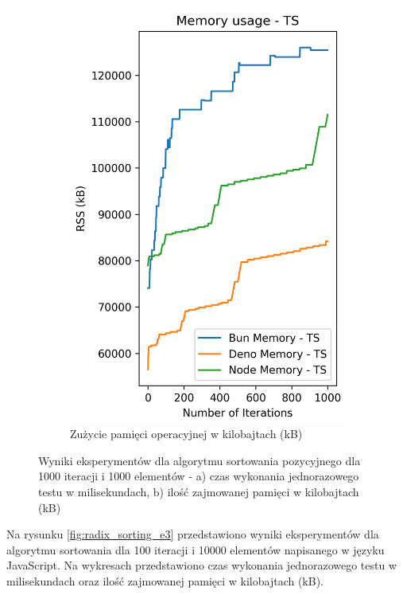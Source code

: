 \begin{figure}[H]
\begin{subfigure}[b]{0.42\textwidth}
    \includegraphics[width=\textwidth]{Figures/sorting/sorting_radix_1000_1000_ts_memory.png}
    \caption{Zużycie pamięci operacyjnej w kilobajtach (kB)}
    \label{fig:radix_sorting_e2_ts_memory}
  \end{subfigure}
  \caption{Wyniki eksperymentów dla algorytmu sortowania pozycyjnego dla 1000 iteracji i 1000 elementów - a) czas wykonania jednorazowego testu w milisekundach, b) ilość zajmowanej pamięci w kilobajtach (kB)}
  \label{fig:radix_sorting_e2_ts}
\end{figure}

Na rysunku \ref{fig:radix_sorting_e3} przedstawiono wyniki eksperymentów dla algorytmu sortowania dla 100 iteracji i 10000 elementów napisanego w języku JavaScript. Na wykresach przedstawiono czas wykonania jednorazowego testu w milisekundach oraz ilość zajmowanej pamięci w kilobajtach (kB).

